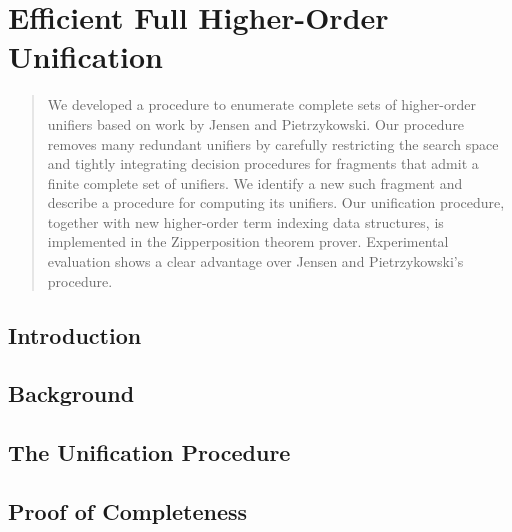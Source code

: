 \chapter{Efficient Full Higher-Order Unification}
\label{ch:unif}



\begin{abstract}
  We developed a procedure to enumerate complete sets of higher-order unifiers based on work
  by Jensen and Pietrzykowski. Our procedure removes many redundant unifiers by
  carefully restricting the search space and tightly integrating decision
  procedures for fragments that admit a finite complete set of unifiers. We
  identify a new such fragment and describe a procedure for computing its unifiers.
  Our unification procedure, together with new higher-order term indexing data structures, 
  is implemented in the Zipperposition theorem prover.
  Experimental evaluation shows a clear advantage over Jensen and Pietrzykowski's
  procedure.    
\end{abstract}
    
\newpage

\section{Introduction}
\label{sec:unif:intro}

\section{Background}
\label{sec:unif:background}

\section{The Unification Procedure}
\label{sec:unif:the-unification-procedure}

\section{Proof of Completeness}
\label{sec:unif:proof-of-completeness}

